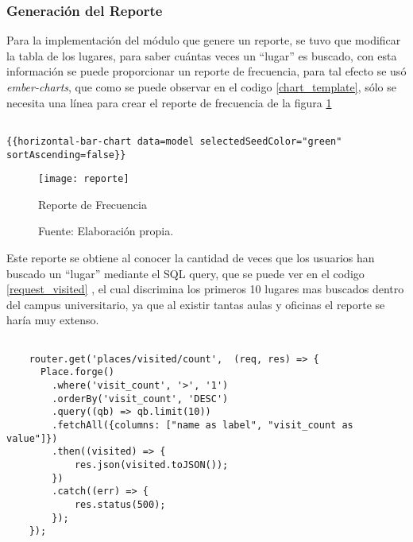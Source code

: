 \subsubsection{Generación del Reporte}

Para la implementación del módulo que genere un reporte, se tuvo que modificar la tabla de los lugares, para saber cuántas veces un ``lugar'' es buscado, con esta información se puede proporcionar un reporte de frecuencia, para tal efecto se usó \emph{ember-charts}, que como se puede observar en el codigo \ref{chart_template}, sólo se necesita una línea para crear el reporte de frecuencia de la figura \ref{fig:reporte} \\

\begin{center}
  \begin{lstlisting}[label=chart_template,caption=Componente de \emph{Ember-charts}.]

{{horizontal-bar-chart data=model selectedSeedColor="green" sortAscending=false}}

  \end{lstlisting}
\end{center}

\begin{figure}[H]
      \begin{center}
        \texttt{[image: reporte]}

        \caption{Reporte de Frecuencia}
        \label{fig:reporte}
        \caption*{Fuente: Elaboración propia.}
      \end{center}
\end{figure}



Este reporte se obtiene al conocer la cantidad de veces que los usuarios han buscado un ``lugar'' mediante el SQL query, que se puede ver en el codigo \ref{request_visited} , el cual discrimina los primeros 10 lugares mas buscados dentro del campus universitario, ya que al existir tantas aulas y oficinas el reporte se haría muy extenso. \\

\begin{center}
  \begin{lstlisting}[label=request_visited,caption=Insertar un ``lugar'' en la base de datos.]

    router.get('places/visited/count',  (req, res) => {
      Place.forge()
        .where('visit_count', '>', '1')
        .orderBy('visit_count', 'DESC')
        .query((qb) => qb.limit(10))
        .fetchAll({columns: ["name as label", "visit_count as value"]})
        .then((visited) => {
            res.json(visited.toJSON());
        })
        .catch((err) => {
            res.status(500);
        });
    });

  \end{lstlisting}
\end{center}
